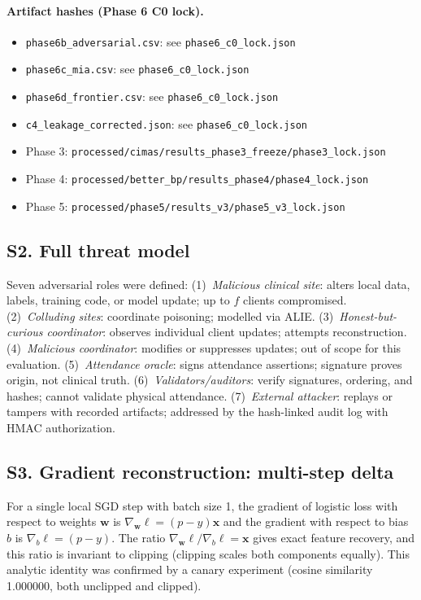 \paragraph{Artifact hashes (Phase 6 C0 lock).}
\begin{itemize}
  \item \texttt{phase6b\_adversarial.csv}: see \texttt{phase6\_c0\_lock.json}
  \item \texttt{phase6c\_mia.csv}: see \texttt{phase6\_c0\_lock.json}
  \item \texttt{phase6d\_frontier.csv}: see \texttt{phase6\_c0\_lock.json}
  \item \texttt{c4\_leakage\_corrected.json}: see \texttt{phase6\_c0\_lock.json}
  \item Phase 3: \texttt{processed/cimas/results\_phase3\_freeze/phase3\_lock.json}
  \item Phase 4: \texttt{processed/better\_bp/results\_phase4/phase4\_lock.json}
  \item Phase 5: \texttt{processed/phase5/results\_v3/phase5\_v3\_lock.json}
\end{itemize}

\subsection*{S2. Full threat model}

Seven adversarial roles were defined:
(1)~\emph{Malicious clinical site}: alters local data, labels, training code,
or model update; up to $f$ clients compromised.
(2)~\emph{Colluding sites}: coordinate poisoning; modelled via ALIE.
(3)~\emph{Honest-but-curious coordinator}: observes individual client updates;
attempts reconstruction.
(4)~\emph{Malicious coordinator}: modifies or suppresses updates;
out of scope for this evaluation.
(5)~\emph{Attendance oracle}: signs attendance assertions;
signature proves origin, not clinical truth.
(6)~\emph{Validators/auditors}: verify signatures, ordering, and hashes;
cannot validate physical attendance.
(7)~\emph{External attacker}: replays or tampers with recorded artifacts;
addressed by the hash-linked audit log with HMAC authorization.

\subsection*{S3. Gradient reconstruction: multi-step delta}

For a single local SGD step with batch size 1, the gradient
of logistic loss with respect to weights $\mathbf{w}$ is
$\nabla_\mathbf{w}\ell = (p-y)\mathbf{x}$
and the gradient with respect to bias $b$ is $\nabla_b\ell = (p-y)$.
The ratio $\nabla_\mathbf{w}\ell / \nabla_b\ell = \mathbf{x}$ gives
exact feature recovery, and this ratio is invariant to clipping
(clipping scales both components equally).
This analytic identity was confirmed by a canary experiment
(cosine similarity 1.000000, both unclipped and clipped).

